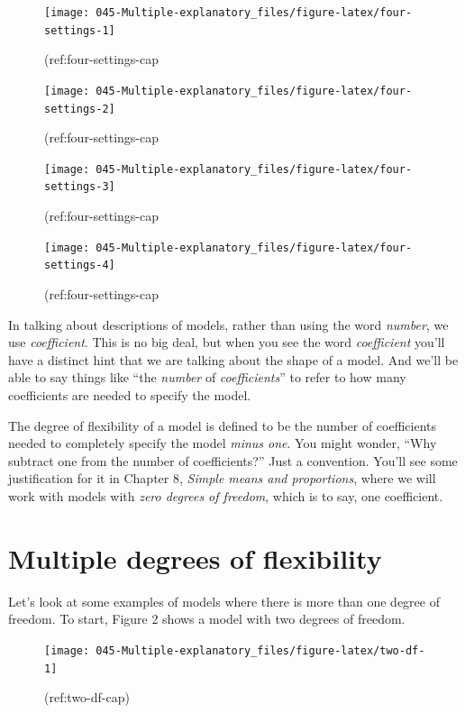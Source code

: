\documentclass[]{tufte-book}
\begin{document}
\begin{figure}\texttt{[image: 045-Multiple-explanatory\_files/figure-latex/four-settings-1]} \caption[(ref:four-settings-cap]{(ref:four-settings-cap}\label{fig:four-settings}
\end{figure}
\begin{figure}\texttt{[image: 045-Multiple-explanatory\_files/figure-latex/four-settings-2]} \caption[(ref:four-settings-cap]{(ref:four-settings-cap}\label{fig:four-settings}
\end{figure}
\begin{figure}\texttt{[image: 045-Multiple-explanatory\_files/figure-latex/four-settings-3]} \caption[(ref:four-settings-cap]{(ref:four-settings-cap}\label{fig:four-settings}
\end{figure}
\begin{figure}\texttt{[image: 045-Multiple-explanatory\_files/figure-latex/four-settings-4]} \caption[(ref:four-settings-cap]{(ref:four-settings-cap}\label{fig:four-settings}
\end{figure}

In talking about descriptions of models, rather than using the word \emph{number}, we use \emph{coefficient}. This is no big deal, but when you see the word \emph{coefficient} you'll have a distinct hint that we are talking about the shape of a model. And we'll be able to say things like ``the \emph{number} of \emph{coefficients}'' to refer to how many coefficients are needed to specify the model.

The degree of flexibility of a model is defined to be the number of coefficients needed to completely specify the model \emph{minus one}. You might wonder, ``Why subtract one from the number of coefficients?'' Just a convention. You'll see some justification for it in Chapter 8, \emph{Simple means and proportions}, where we will work with models with \emph{zero degrees of freedom}, which is to say, one coefficient.

\hypertarget{multiple-degrees-of-flexibility}{%
\section{Multiple degrees of flexibility}\label{multiple-degrees-of-flexibility}}

Let's look at some examples of models where there is more than one degree of freedom. To start, Figure 2 shows a model with two degrees of freedom.

\begin{figure}\texttt{[image: 045-Multiple-explanatory\_files/figure-latex/two-df-1]} \caption[(ref:two-df-cap)]{(ref:two-df-cap)}\label{fig:two-df}
\end{figure}
\end{document}

